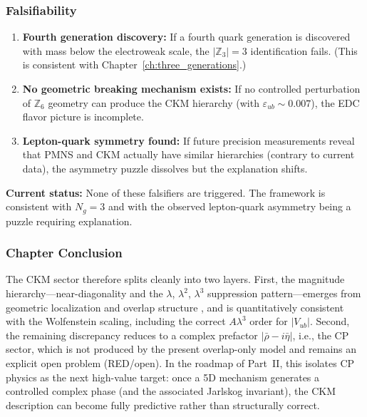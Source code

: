 \subsubsection{Falsifiability}

\begin{tcolorbox}[colback=orange!5, colframe=orange!50!black,
    title=\textbf{What Would Falsify EDC's Flavor Picture?}]
\begin{enumerate}[nosep]
    \item \textbf{Fourth generation discovery:}
          If a fourth quark generation is discovered with mass below the
          electroweak scale, the $|\mathbb{Z}_3| = 3$ identification fails.
          (This is consistent with Chapter~\ref{ch:three_generations}.)

    \item \textbf{No geometric breaking mechanism exists:}
          If no controlled perturbation of $\mathbb{Z}_6$ geometry can produce
          the CKM hierarchy (with $\varepsilon_{ub} \sim 0.007$), the EDC
          flavor picture is incomplete.

    \item \textbf{Lepton-quark symmetry found:}
          If future precision measurements reveal that PMNS and CKM actually
          have similar hierarchies (contrary to current data), the asymmetry
          puzzle dissolves but the explanation shifts.
\end{enumerate}
\textbf{Current status:} None of these falsifiers are triggered. The framework
is consistent with $N_g = 3$ and with the observed lepton-quark asymmetry
being a puzzle requiring explanation.
\end{tcolorbox}

\subsubsection{Chapter Conclusion}

The CKM sector therefore splits cleanly into two layers. First, the magnitude
hierarchy---near-diagonality and the $\lambda$, $\lambda^2$, $\lambda^3$
suppression pattern---emerges from geometric localization and overlap structure
\tagDc{}, and is quantitatively consistent with the Wolfenstein scaling,
including the correct $A\lambda^3$ order for $|V_{ub}|$. Second, the remaining
discrepancy reduces to a complex prefactor $|\bar\rho - i\bar\eta|$, i.e.,
the CP sector, which is not produced by the present overlap-only model and
remains an explicit open problem (RED/open). In the roadmap of Part~II, this
isolates CP physics as the next high-value target: once a 5D mechanism generates
a controlled complex phase (and the associated Jarlskog invariant), the CKM
description can become fully predictive rather than structurally correct.

